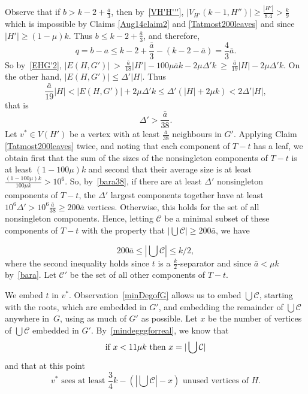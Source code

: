 \documentclass[12pt]{article}
\begin{document}
                      
                     Observe that if $b> k-2+\frac{\bar a}{3}$, then
 by~\eqref{VH'H'''},
 $|V_{H'}(k-1, H'')|\ge \frac{|H'|}{8.4}> \frac{k}9$
 which is impossible  by Claims \ref{Aug14claim2} and \ref{Tatmost200leaves} and since $|H'|\ge(1-\mu)k$. 
Thus $b\le k-2+\frac{\bar a}{3}$,
and therefore, 
 $$q =b-a\le k-2+\frac{\bar a}{3}  -  (k-2-\bar a)= \frac 4{3}\bar a.$$ 
So by~\eqref{EHG'2}, 
$|E(H, G')| \ > \ \frac{\bar a}{18}|H'| -100 \mu \bar a  k   -2\mu \Delta' k\ \ge \ \frac{\bar a}{19}|H|    -2\mu \Delta' k.$
On the other hand, $|E(H, G')| \le \Delta'|H|$. Thus 
$$ \frac{\bar a}{19}|H|  <    |E(H, G')| +2\mu \Delta' k 
\le 
\Delta' (|H| + 2\mu   k)<2 \Delta' |H| ,$$
that is
\begin{equation}\label{bara38}
\Delta'  >   \frac{\bar a}{38}.
\end{equation}
Let  $v^*\in V(H')$  be a vertex with  at least $\frac{\bar a}{38}$ neighbours in $G'$.
Applying Claim \ref{Tatmost200leaves} twice, and noting that each component of $T-t$ has a leaf,  we obtain first that the  sum of the sizes of the nonsingleton components of $T-t$ is at least $(1-100 \mu)k$  and second that their average size is at least $\frac{(1-100\mu)k}{100\mu k}>10^6$. 
So,
 by~\eqref{bara38}, if there are at least $\Delta'$ nonsingleton components of $T-t$, the $\Delta'$  largest  components together have at least $10^6\Delta'>10^6\frac{\bar a}{38} \ge 200\bar a$ vertices. Otherwise, this holds for the set of all nonsingleton components.
 Hence, 
letting $\mathcal C$ be a minimal subset of these components  of $T-t$ with the property that $|\bigcup\mathcal C| \ge 200\bar a$, we have  

\begin{equation}\label{100baraa}
200\bar a\le  |\bigcup \mathcal C|\le k/2,
\end{equation}
where the second inequality holds since $t$ is a $\frac k2$-separator and since $\bar a  <\mu k$ by~\eqref{bara}. 
 Let $\mathcal C'$ be the set of all 
 other components of $T-t$. 




We embed $t$ in $v^*$.  Observation~\ref{minDegofG} allows us to embed  $\bigcup\mathcal C$, starting with the roots, which are embedded in $G'$, and embedding the remainder of $\bigcup\mathcal C$ anywhere  in~$G$, using as much of $G'$ as possible. Let $x$ be the number of vertices  of $\bigcup\mathcal C$ embedded in $G'$. By~\eqref{mindegggforreal}, we know that 
\begin{equation}\label{ifx11}
   \text{if $ x <11\mu k$ then $x=|\bigcup \mathcal C|$} 
\end{equation}
and that at this point
 \begin{equation}\label{aboutv*}
         \text{$v^*$ sees at least $\frac 34k -(|\bigcup \mathcal C|-x)$ unused vertices of~$H$.}
         \end{equation}
\end{document}
